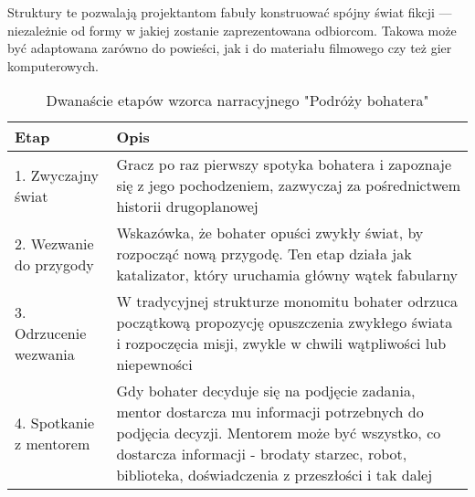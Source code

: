 Struktury te pozwalają projektantom fabuły konstruować spójny świat fikcji --- niezależnie od formy w
jakiej zostanie zaprezentowana odbiorcom. Takowa może być adaptowana zarówno do powieści, jak i do materiału
filmowego czy też gier komputerowych.

\begin{table}[h!]
	\caption{Dwanaście etapów wzorca narracyjnego "Podróży bohatera" \cite{narrative_structures}}
	\label{tab1:ch1_1_1}
	\begin{center}
		\begin{tabular}{p{1.5in} p{4in}}
			\hline
			Etap                                & Opis                                                                                                                                                                                                                                                                                                                            \\
			\hline
			1. Zwyczajny świat                  & Gracz po raz pierwszy spotyka bohatera i zapoznaje się z jego pochodzeniem, zazwyczaj za pośrednictwem historii drugoplanowej                                                                                                                                                                                                   \\
			2. Wezwanie do przygody             & Wskazówka, że bohater opuści zwykły świat, by rozpocząć nową przygodę. Ten etap działa jak katalizator, który uruchamia główny wątek fabularny                                                                                                                                                                                  \\
			3. Odrzucenie wezwania              & W tradycyjnej strukturze monomitu bohater odrzuca początkową propozycję opuszczenia zwykłego świata i rozpoczęcia misji, zwykle w chwili wątpliwości lub niepewności                                                                                                                                                            \\
			4. Spotkanie z mentorem             & Gdy bohater decyduje się na podjęcie zadania, mentor dostarcza mu informacji potrzebnych do podjęcia decyzji. Mentorem może być wszystko, co dostarcza informacji - brodaty starzec, robot, biblioteka, doświadczenia z przeszłości i tak dalej                                                                                 \\

\end{tabular}
\end{center}
\end{table}
